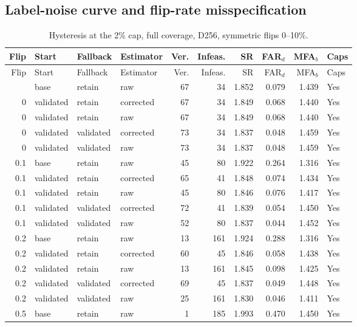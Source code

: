 \subsection{Label-noise curve and flip-rate misspecification}
{\footnotesize\setlength{\tabcolsep}{4pt}
\begin{longtable}{rlllrrrrrl}
\caption{Hysteresis at the 2\% cap, full coverage, D256, symmetric flips 0--10\%.}\label{tab:s7_noise}\\
\toprule
Flip & Start & Fallback & Estimator & Ver. & Infeas. & SR & FAR$_d$ & MFA$_b$ & Caps\\
\midrule
\endfirsthead
\toprule
Flip & Start & Fallback & Estimator & Ver. & Infeas. & SR & FAR$_d$ & MFA$_b$ & Caps\\
\midrule
\endhead
\bottomrule
\endfoot
0 & base & retain & raw & 67 & 34 & 1.852 & 0.079 & 1.439 & Yes\\
0 & validated & retain & corrected & 67 & 34 & 1.849 & 0.068 & 1.440 & Yes\\
0 & validated & retain & raw & 67 & 34 & 1.849 & 0.068 & 1.440 & Yes\\
0 & validated & validated & corrected & 73 & 34 & 1.837 & 0.048 & 1.459 & Yes\\
0 & validated & validated & raw & 73 & 34 & 1.837 & 0.048 & 1.459 & Yes\\
0.1 & base & retain & raw & 45 & 80 & 1.922 & 0.264 & 1.316 & Yes\\
0.1 & validated & retain & corrected & 65 & 41 & 1.848 & 0.074 & 1.434 & Yes\\
0.1 & validated & retain & raw & 45 & 80 & 1.846 & 0.076 & 1.417 & Yes\\
0.1 & validated & validated & corrected & 72 & 41 & 1.839 & 0.054 & 1.450 & Yes\\
0.1 & validated & validated & raw & 52 & 80 & 1.837 & 0.044 & 1.452 & Yes\\
0.2 & base & retain & raw & 13 & 161 & 1.924 & 0.288 & 1.316 & Yes\\
0.2 & validated & retain & corrected & 60 & 45 & 1.846 & 0.058 & 1.438 & Yes\\
0.2 & validated & retain & raw & 13 & 161 & 1.845 & 0.098 & 1.425 & Yes\\
0.2 & validated & validated & corrected & 69 & 45 & 1.837 & 0.049 & 1.448 & Yes\\
0.2 & validated & validated & raw & 25 & 161 & 1.830 & 0.046 & 1.411 & Yes\\
0.5 & base & retain & raw & 1 & 185 & 1.993 & 0.470 & 1.450 & Yes\\

\end{longtable}}
